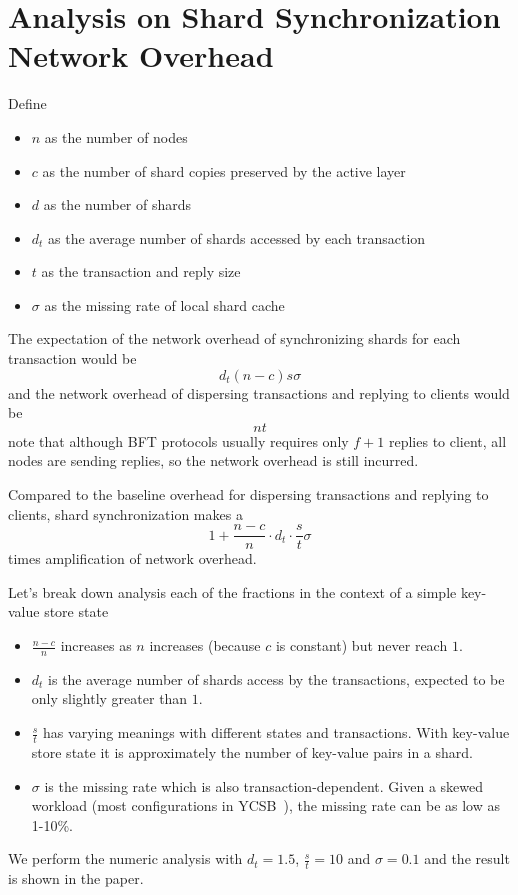 
\section{Analysis on Shard Synchronization Network Overhead}

Define
\begin{itemize}
    \item $n$ as the number of nodes
    \item $c$ as the number of shard copies preserved by the active layer
    \item $d$ as the number of shards
    \item $d_t$ as the average number of shards accessed by each transaction
    \item $t$ as the transaction and reply size
    \item $\sigma$ as the missing rate of local shard cache
\end{itemize}

The expectation of the network overhead of synchronizing shards for each transaction would be
\[
    d_t(n-c)s\sigma
\]
and the network overhead of dispersing transactions and replying to clients would be
\[
    nt
\]
note that although BFT protocols usually requires only $f+1$ replies to client, all nodes are sending replies, so the network overhead is still incurred.

Compared to the baseline overhead for dispersing transactions and replying to clients, shard synchronization makes a
\[
    1+\frac{n-c}{n}\cdot{}d_t\cdot{}\frac{s}{t}\sigma
\]
times amplification of network overhead.

Let's break down analysis each of the fractions in the context of a simple key-value store state
\begin{itemize}
    \item $\frac{n-c}{n}$ increases as $n$ increases (because $c$ is constant) but never reach $1$.
    \item $d_t$ is the average number of shards access by the transactions, expected to be only slightly greater than $1$.
    \item $\frac{s}{t}$ has varying meanings with different states and transactions.
    With key-value store state it is approximately the number of key-value pairs in a shard.
    \item $\sigma$ is the missing rate which is also transaction-dependent.
    Given a skewed workload (\eg most configurations in YCSB~\cite{cooper2010benchmarking}), the missing rate can be as low as 1-10\%.
\end{itemize}

We perform the numeric analysis with $d_t=1.5$, $\frac{s}{t}=10$ and $\sigma=0.1$ and the result is shown in the paper.
